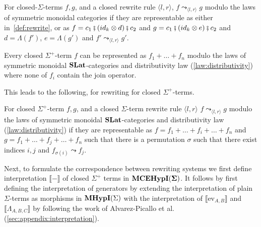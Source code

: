\begin{definition}
	For closed-$\Sigma$-terms $f,g$, and a closed rewrite rule $\langle l, r \rangle$, $f \leadsto_{\langle l, r \rangle} g$ modulo the laws of symmetric monoidal categories if they are representable as either in~\autoref{def:rewrite}, or as
	$
		f = c_{1}\fatsemi(id_{k} \otimes d)\fatsemi c_{2} $ and $ g = c_{1}\fatsemi(id_{k} \otimes e)\fatsemi c_{2}
	$
	and $d = \Lambda(f')$, $e = \Lambda(g')$ and $f' \leadsto_{\langle l, r \rangle} g'$.
\end{definition}
\begin{lemma}
	\label{lemma:normal_form}
	Every closed $\Sigma^{+}$-term $f$ can be represented as
	$
		f_{1} + \ldots + f_{n}
	$ modulo the laws of symmetric monoidal $\mathbf{SLat}$-categories and distributivity law (\autoref{law:distributivity}) where none of $f_{i}$ contain the join operator.
\end{lemma}
This leads to the following, for rewriting for closed $\Sigma^{+}$-terms.
\begin{definition}
	For closed $\Sigma^{+}$-term $f,g$, and a closed $\Sigma$-term rewrite rule $\langle l, r \rangle$ $f \leadsto_{\langle l, r \rangle} g$ modulo the laws of symmetric monoidal $\mathbf{SLat}$-categories and distributivity law (\autoref{law:distributivity}) if they are representable as
	$
		f = f_{1} + \ldots + f_{i} + \ldots + f_{n} $ and $ g = f_{1} + \ldots + f_{j} + \ldots + f_{n}
	$
	such that there is a permutation $\sigma$ such that there exist indices $i,j$ and $f_{\sigma(i)} \leadsto f_{j}$.
\end{definition}
Next, to formulate the correspondence between rewriting systems we first define interpretation $\llbracket - \rrbracket$ of closed $\Sigma^{+}$ terms in ${\mathbf{MCEHypI(\Sigma)}}$.
It follows by first defining the interpretation of generators by extending the interpretation of plain $\Sigma$-terms as morphisms in $\textbf{MHypI}(\Sigma)$ with the interpretation of $\llbracket \text{ev}_{A,B}\rrbracket$ and $\llbracket \Lambda_{A,B,C} \rrbracket$ by following the work of Alvarez-Picallo et al.~\cite{fscd} (\autoref{sec:appendix:interpretation}).


